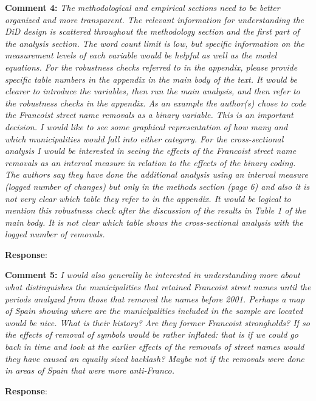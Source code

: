 \documentclass[12pt, a4paper, notitlepage]{article}
\begin{document}
\textbf{Comment 4:} \textit{The methodological and empirical sections need to be better organized and more transparent. The relevant information for understanding the DiD design is scattered throughout the methodology section and the first part of the analysis section. The word count limit is low, but specific information on the measurement levels of each variable would be helpful as well as the model equations. For the robustness checks referred to in the appendix, please provide specific table numbers in the appendix in the main body of the text. It would be clearer to introduce the variables, then run the main analysis, and then refer to the robustness checks in the appendix. As an example the author(s) chose to code the Francoist street name removals as a binary variable. This is an important decision. I would like to see some graphical representation of how many and which municipalities would fall into either category. For the cross-sectional analysis I would be interested in seeing the effects of the Francoist street name removals as an interval measure in relation to the effects of the binary coding. The authors say they have done the additional analysis using an interval measure (logged number of changes) but only in the methods section (page 6) and also it is not very clear which table they refer to in the appendix. It would be logical to mention this robustness check after the discussion of the results in Table 1 of the main body. It is not clear which table shows the cross-sectional analysis with the logged number of removals.}

\textbf{Response}: {\color{red}{pending}}

\textbf{Comment 5:} \textit{I would also generally be interested in understanding more about what distinguishes the municipalities that retained Francoist street names until the periods analyzed from those that removed the names before 2001. Perhaps a map of Spain showing where are the municipalities included in the sample are located would be nice. What is their history? Are they former Francoist strongholds? If so the effects of removal of symbols would be rather inflated: that is if we could go back in time and look at the earlier effects of the removals of street names would they have caused an equally sized backlash? Maybe not if the removals were done in areas of Spain that were more anti-Franco.}

\textbf{Response}: {\color{red}{pending}}
\end{document}
